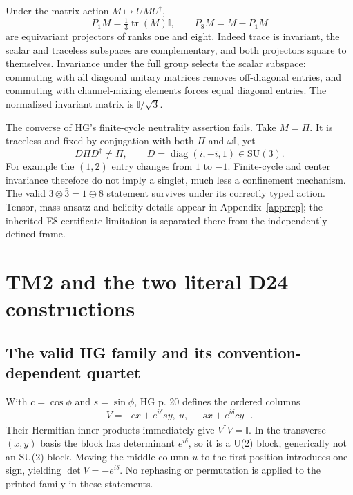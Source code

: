 \documentclass[11pt,a4paper]{article}
\numberwithin{equation}{section}
\newcommand{\tr}{\operatorname{tr}}\newcommand{\diag}{\operatorname{diag}}
\newcommand{\I}{\mathbb I}\newcommand{\Argz}{\operatorname{Arg}_0}
\begin{document}
Under the matrix action $M\mapsto UMU^\dagger$,
\begin{equation}\label{eq:projectors}
 P_1M=\tfrac13\tr(M)\I,\qquad P_8M=M-P_1M
\end{equation}
are equivariant projectors of ranks one and eight. Indeed trace is invariant, the scalar and traceless subspaces are complementary, and both projectors square to themselves. Invariance under the full group selects the scalar subspace: commuting with all diagonal unitary matrices removes off-diagonal entries, and commuting with channel-mixing elements forces equal diagonal entries. The normalized invariant matrix is $\I/\sqrt3$.

The converse of HG's finite-cycle neutrality assertion fails. Take $M=\Pi$. It is traceless and fixed by conjugation with both $\Pi$ and $\omega\I$, yet
\begin{equation}\label{eq:singletcounter}
 D\Pi D^\dagger\ne\Pi,\qquad D=\diag(i,-i,1)\in\mathrm{SU}(3).
\end{equation}
For example the $(1,2)$ entry changes from $1$ to $-1$. Finite-cycle and center invariance therefore do not imply a singlet, much less a confinement mechanism. The valid $3\otimes\bar3=1\oplus8$ statement survives under its correctly typed action. Tensor, mass-ansatz and helicity details appear in Appendix~\ref{app:rep}; the inherited E8 certificate limitation is separated there from the independently defined frame.

\section{TM2 and the two literal D24 constructions}\label{sec:mixing}
\subsection{The valid HG family and its convention-dependent quartet}\label{sec:tm2}
With $c=\cos\phi$ and $s=\sin\phi$, HG p. 20 defines the ordered columns
\begin{equation}\label{eq:tm2}
 V=[c x+e^{i\delta}s y,\ u,\ -s x+e^{i\delta}c y].
\end{equation}
Their Hermitian inner products immediately give $V^\dagger V=\I$. In the transverse $(x,y)$ basis the block has determinant $e^{i\delta}$, so it is a U(2) block, generically not an SU(2) block. Moving the middle column $u$ to the first position introduces one sign, yielding $\det V=-e^{i\delta}$. No rephasing or permutation is applied to the printed family in these statements.
\end{document}
